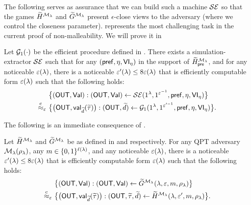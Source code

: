 The following  serves as assurance that we can build such a machine $\mathcal{SE}$ so that the games $\widetilde{H}^{\mathcal{M}_\lambda}$ and $\widetilde{G}^{\mathcal{M}_\lambda}$ present $\epsilon$-close views to the adversary (where we control the closeness parameter).  represents the most challenging task in the current proof of non-malleability. We will prove it in 
\begin{lemma}\label{lem:simext:closeness}
    Let $\mathcal{G}_1(\cdot)$ be the efficient procedure defined in . There exists a simulation-extractor $\mathcal{SE}$ such that for any $(\mathsf{pref},\eta,\mathsf{VI}_\eta)$ in the support of $\widetilde{H}^{\mathcal{M}_\lambda}_\mathsf{pre}$, and for any noticeable $\varepsilon(\lambda)$, there is a noticeable $\varepsilon'(\lambda) \le 8\varepsilon(\lambda)$ that is efficiently computable form $\varepsilon(\lambda)$ such that the following holds:
    \begin{align*}
        &
        \big\{(\mathsf{OUT}, \mathsf{Val}): (\mathsf{OUT}, \mathsf{Val}) \gets \mathcal{SE}(1^\lambda, 1^{\varepsilon^{-1}},\mathsf{pref},\eta,\mathsf{VI}_\eta) \big\}
        \\
        \stackrel{\text{c}}{\approx}_{\varepsilon} 
        ~&
        \big\{\big(\mathsf{OUT}, \mathsf{val}_{\widetilde{d}}(\widetilde{\tau})\big): (\mathsf{OUT},  \widetilde{d}) \gets \mathcal{G}_1(1^\lambda, 1^{\varepsilon'^{-1}}, \mathsf{pref},\eta,\mathsf{VI}_\eta) \big\}.
    \end{align*}
\end{lemma} 
The following  is an immediate consequence of . 
\begin{corollary}\label{lem:bbnmc:compare:Htil:Gtil}
    Let $\widetilde{H}^{\mathcal{M}_\lambda}$ and $\widetilde{G}^{\mathcal{M}_\lambda}$ be as defined in  and  respectively. For any QPT adversary $\mathcal{M}_\lambda(\rho_\lambda)$, any $m \in \{0,1\}^{\ell(\lambda)}$, 
    and any noticeable $\varepsilon(\lambda)$, there is a noticeable $\varepsilon'(\lambda) \le 8\varepsilon(\lambda)$ that is efficiently computable form $\varepsilon(\lambda)$ such that the following holds: 
    \begin{align*}
        &
        \big\{(\mathsf{OUT}, \mathsf{Val}): (\mathsf{OUT}, \mathsf{Val}) \gets \widetilde{G}^{\mathcal{M}_\lambda}(\lambda, \varepsilon, m, \rho_\lambda) \big\} 
        \\
        \stackrel{\text{c}}{\approx}_{\varepsilon} 
        ~&
        \big\{\big(\mathsf{OUT}, \mathsf{val}_{\widetilde{d}}(\widetilde{\tau})\big): (\mathsf{OUT}, \widetilde{\tau}, \widetilde{d}) \gets \widetilde{H}^{\mathcal{M}_\lambda}(\lambda, \varepsilon', m, \rho_\lambda) \big\}.
    \end{align*}
\end{corollary}

